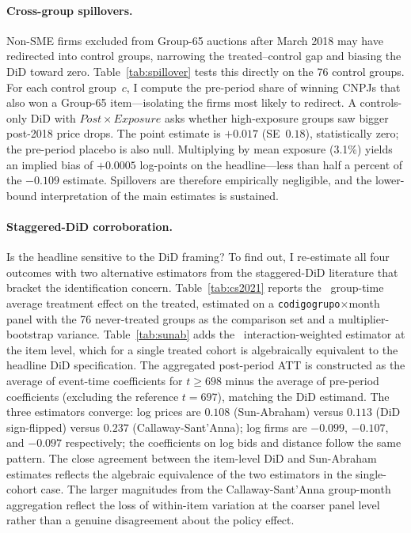 \paragraph{Cross-group spillovers.}
Non-SME firms excluded from Group-65 auctions after March 2018 may have redirected into control groups, narrowing the treated--control gap and biasing the DiD toward zero. Table~\ref{tab:spillover} tests this directly on the 76 control groups. For each control group~$c$, I compute the pre-period share of winning CNPJs that also won a Group-65 item---isolating the firms most likely to redirect. A controls-only DiD with $\mathit{Post} \times \mathit{Exposure}$ asks whether high-exposure groups saw bigger post-2018 price drops. The point estimate is $+0.017$ (SE~$0.18$), statistically zero; the pre-period placebo is also null. Multiplying by mean exposure (3.1\%) yields an implied bias of $+0.0005$ log-points on the headline---less than half a percent of the $-0.109$ estimate. Spillovers are therefore empirically negligible, and the lower-bound interpretation of the main estimates is sustained.



\paragraph{Staggered-DiD corroboration.}
Is the headline sensitive to the DiD framing? To find out, I re-estimate all four outcomes with two alternative estimators from the staggered-DiD literature that bracket the identification concern. Table~\ref{tab:cs2021} reports the~\citet{callaway2021} group-time average treatment effect on the treated, estimated on a \texttt{codigogrupo}$\times$month panel with the 76 never-treated groups as the comparison set and a multiplier-bootstrap variance. Table~\ref{tab:sunab} adds the~\citet{sun2021} interaction-weighted estimator at the item level, which for a single treated cohort is algebraically equivalent to the headline DiD specification. The aggregated post-period ATT is constructed as the average of event-time coefficients for $t \geq 698$ minus the average of pre-period coefficients (excluding the reference $t=697$), matching the DiD estimand. The three estimators converge: log prices are $0.108$ (Sun-Abraham) versus $0.113$ (DiD sign-flipped) versus $0.237$ (Callaway-Sant'Anna); log firms are $-0.099$, $-0.107$, and $-0.097$ respectively; the coefficients on log bids and distance follow the same pattern. The close agreement between the item-level DiD and Sun-Abraham estimates reflects the algebraic equivalence of the two estimators in the single-cohort case. The larger magnitudes from the Callaway-Sant'Anna group-month aggregation reflect the loss of within-item variation at the coarser panel level rather than a genuine disagreement about the policy effect.

